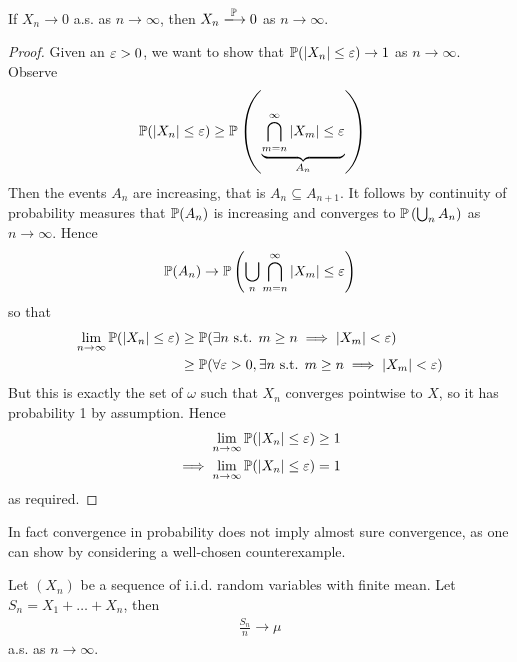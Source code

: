 \documentclass{../../template/note}
\begin{document}
    \begin{proposition}
        If \(X_n \to 0\) a.s. as \(n \to \infty\), then \(X_n \pto 0\) as \(n \to \infty\).
    \end{proposition}
    
    \begin{proof}
        Given an \(\varepsilon > 0\), we want to show that \(\mathbb P(|X_n| \leq \varepsilon) \to 1\) as \(n \to \infty\). Observe
        \begin{align*}
            \mathbb P(|X_n| \leq \varepsilon) &\geq \mathbb P\left(\underbrace{\bigcap_{m=n}^\infty |X_m| \leq \varepsilon}_{A_n}\right)
        \end{align*}
        Then the events \(A_n\) are increasing, that is \(A_n \subseteq A_{n+1}\). It follows by continuity of probability measures that \(\mathbb P(A_n)\) is increasing and converges to \(\mathbb P\left(\bigcup_n A_n\right)\) as \(n \to \infty\). Hence
        \begin{align*}
            \mathbb P(A_n) \to \mathbb P\left(\bigcup_n \bigcap_{m=n}^\infty |X_m| \leq \varepsilon\right)
        \end{align*}
        so that
        \begin{align*}
            \lim_{n \to \infty} \mathbb P(|X_n| \leq \varepsilon) &\geq \mathbb P(\exists n \text{ s.t. } m \geq n \implies |X_m| < \varepsilon) \\
            &\geq \mathbb P(\forall \varepsilon > 0, \exists n \text{ s.t. } m \geq n \implies |X_m| < \varepsilon)
        \end{align*}
        But this is exactly the set of \(\omega\) such that \(X_n\) converges pointwise to \(X\), so it has probability 1 by assumption. Hence
        \begin{align*}
            \lim_{n \to \infty} \mathbb P(|X_n| \leq \varepsilon) &\geq 1 \\
            \implies \lim_{n \to \infty} \mathbb P(|X_n| \leq \varepsilon) &= 1
        \end{align*}
        as required.
    \end{proof}
    
    \begin{remark*}
        In fact convergence in probability does not imply almost sure convergence, as one can show by considering a well-chosen counterexample.
    \end{remark*}
    
    \begin{theorem}
        Let \((X_n)\) be a sequence of i.i.d. random variables with finite mean. Let \(S_n = X_1 + \dots + X_n\), then
        \begin{align*}
            \frac{S_n}n \to \mu
        \end{align*}
        a.s. as \(n \to \infty\).        
    \end{theorem}
\end{document}
